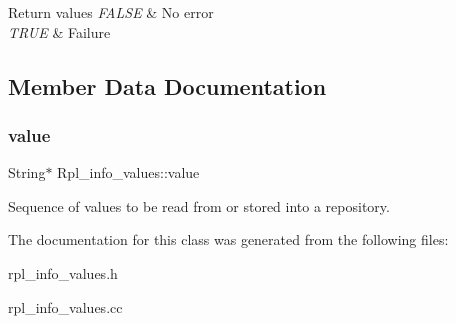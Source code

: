 \begin{DoxyRetVals}{Return values}
{\em F\+A\+L\+SE} & No error \\
\hline
{\em T\+R\+UE} & Failure \\
\hline
\end{DoxyRetVals}


\subsection{Member Data Documentation}
\mbox{\label{classRpl__info__values_a36dafe666e67700c9d7f573d9f0a4c66}} 
\subsubsection{\texorpdfstring{value}{value}}
{\footnotesize\ttfamily String$\ast$ Rpl\+\_\+info\+\_\+values\+::value}

Sequence of values to be read from or stored into a repository. 

The documentation for this class was generated from the following files\+:\begin{DoxyCompactItemize}
\item 
rpl\+\_\+info\+\_\+values.\+h\item 
rpl\+\_\+info\+\_\+values.\+cc\end{DoxyCompactItemize}
